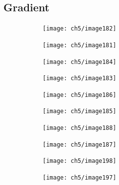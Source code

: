\subsection{Gradient}

\begin{figure}[H]
	\centering
	\begin{subfigure}[b]{0.45\textwidth}
		\texttt{[image: ch5/image182]}
	\end{subfigure}
	\begin{subfigure}[b]{0.45\textwidth}
		\texttt{[image: ch5/image181]}
	\end{subfigure}
\end{figure}

\begin{figure}[H]
	\centering
	\begin{subfigure}[b]{0.45\textwidth}
		\texttt{[image: ch5/image184]}
	\end{subfigure}
	\begin{subfigure}[b]{0.45\textwidth}
		\texttt{[image: ch5/image183]}
	\end{subfigure}
\end{figure}

\begin{figure}[H]
	\centering
	\begin{subfigure}[b]{0.45\textwidth}
		\texttt{[image: ch5/image186]}
	\end{subfigure}
	\begin{subfigure}[b]{0.45\textwidth}
		\texttt{[image: ch5/image185]}
	\end{subfigure}
\end{figure}

\begin{figure}[H]
	\centering
	\begin{subfigure}[b]{0.45\textwidth}
		\texttt{[image: ch5/image188]}
	\end{subfigure}
	\begin{subfigure}[b]{0.45\textwidth}
		\texttt{[image: ch5/image187]}
	\end{subfigure}
\end{figure}

\begin{figure}[H]
	\centering
	\begin{subfigure}[b]{0.45\textwidth}
		\texttt{[image: ch5/image198]}
	\end{subfigure}
	\begin{subfigure}[b]{0.45\textwidth}
		\texttt{[image: ch5/image197]}
	\end{subfigure}
\end{figure}

